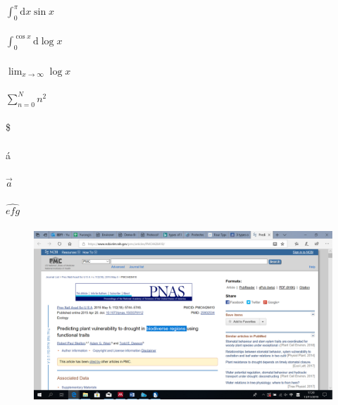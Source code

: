 \documentclass[pt11,a4paper]{book}
\begin{document}
$\int_{0}^{\pi} \textrm{d}x \sin x$

\paragraph{}

$\int_{0}^{\cos x} \textrm{d} \log x$

\paragraph{}

$\lim_{x \to \infty} \log x$

\paragraph{}

$\sum\limits_{n=0}^{N}  n^{2}$

\paragraph{}

\$
\paragraph{}
\'{a}
\paragraph{}
$\vec{a}$
\paragraph{}
$\widehat{efg}$

\paragraph{}

\begin{figure}[t]
\centering
\includegraphics[scale=0.1]{Capture001.png}
\paragraph{}
\label{fig:galaxy}
\end{figure}
\end{document}
